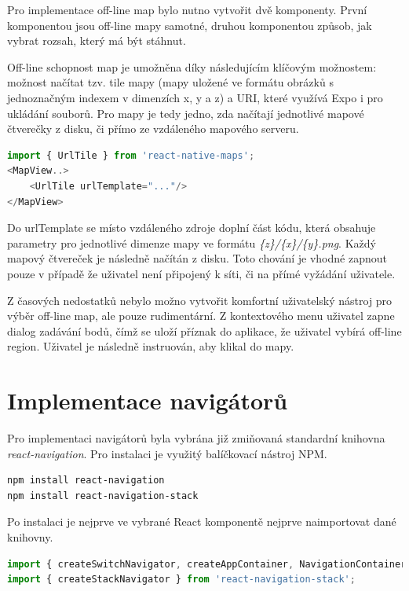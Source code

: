 Pro implementace off-line map bylo nutno vytvořit dvě komponenty. První komponentou jsou off-line mapy samotné, druhou komponentou způsob, jak vybrat rozsah, který má být stáhnut.

Off-line schopnost map je umožněna díky následujícím klíčovým možnostem: možnost načítat tzv. tile mapy (mapy uložené ve formátu obrázků s jednoznačným indexem v dimenzích x, y a z) a URI, které využívá Expo i pro ukládání souborů. Pro mapy je tedy jedno, zda načítají jednotlivé mapové čtverečky z disku, či přímo ze vzdáleného mapového serveru.

\begin{lstlisting}[language=JavaScript, caption=Off-line mapy]
import { UrlTile } from 'react-native-maps';
<MapView..>
	<UrlTile urlTemplate="..."/>
</MapView>
\end{lstlisting}

Do urlTemplate se místo vzdáleného zdroje doplní část kódu, která obsahuje parametry pro jednotlivé dimenze mapy ve formátu \emph{\{z\}/\{x\}/\{y\}.png}. Každý mapový čtvereček je následně načítán z disku. Toto chování je vhodné zapnout pouze v případě že uživatel není připojený k síti, či na přímé vyžádání uživatele.

Z časových nedostatků nebylo možno vytvořit komfortní uživatelský nástroj pro výběr off-line map, ale pouze rudimentární. Z kontextového menu uživatel zapne dialog zadávání bodů, čímž se uloží příznak do aplikace, že uživatel vybírá off-line region. Uživatel je následně instruován, aby klikal do mapy.

\section{Implementace navigátorů}

Pro implementaci navigátorů byla vybrána již zmiňovaná standardní knihovna \emph{react-navigation}. Pro instalaci je využitý balíčkovací nástroj NPM.

\begin{lstlisting}[language=Bash, caption=Instalace react-navigation]
npm install react-navigation
npm install react-navigation-stack
\end{lstlisting}

Po instalaci je nejprve ve vybrané React komponentě nejprve naimportovat dané knihovny. 

\begin{lstlisting}[language=JavaScript, caption=Import knihoven pro hlavní navigátor]
import { createSwitchNavigator, createAppContainer, NavigationContainerComponent, NavigationActions } from 'react-navigation';
import { createStackNavigator } from 'react-navigation-stack';
\end{lstlisting}

